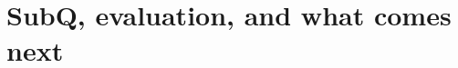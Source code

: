 \setcounter{tocdepth}{1}
\chapter{SubQ, evaluation, and what comes next}
\label{ch:subq-outlook}





\setcounter{tocdepth}{2}
